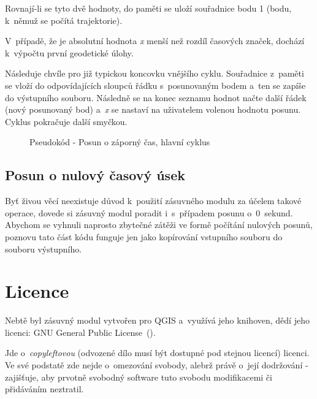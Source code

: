 Rovnají-li se tyto dvě hodnoty, do paměti se uloží
souřadnice bodu 1 (bodu, k~němuž se počítá trajektorie). 

V~případě, že je absolutní hodnota \textit{x} menší než rozdíl časových značek, dochází
k~výpočtu první geodetické úlohy. 

Následuje chvíle pro již typickou koncovku vnějšího cyklu. Souřadnice z~paměti se vloží
do odpovídajících sloupců řádku s~posunovaným bodem a~ten se zapíše do výstupního souboru.
Následně se na konec seznamu hodnot načte další řádek (nový posunovaný bod) a~\textit{x}
se nastaví na uživatelem volenou hodnotu posunu. Cyklus pokračuje další smyčkou. 

    \begin{figure}[h]
    \centering
    \begin{algorithmic}[1]
    \ENDIF
    \ENDFOR
    \ENDWHILE
    \end{algorithmic}
    \caption{Pseudokód - Posun o záporný čas, hlavní cyklus}
    \label{fig:pseudozapornycas-hlavnicyklus}
    \end{figure}

\subsection{Posun o nulový časový úsek}
\label{nulovycas}

Byť živou věcí neexistuje důvod k~použití zásuvného modulu za účelem takové ope\-race,
dovede si zásuvný modul poradit i~s~případem posunu o~0~sekund. Abychom se vyhnuli
naprosto zbytečné zátěži ve formě počítání nulových posunů, poznovu tato část kódu
funguje jen jako kopírování vstupního souboru do souboru výstupního. 

\section{Licence}
\label{licence}

Nebtě byl zásuvný modul vytvořen pro QGIS a~využívá jeho knihoven, dědí jeho licenci: GNU General Public
License~(). 

Jde o~\textit{copyleftovou} (odvozené dílo musí být dostupné pod stejnou licencí)
licenci. Ve své podstatě zde nejde o~omezování svobody, alebrž právě o~její dodržování - zajišťuje,
aby prvotně svobodný software tuto svobodu modifikacemi či přidáváním neztratil. 



